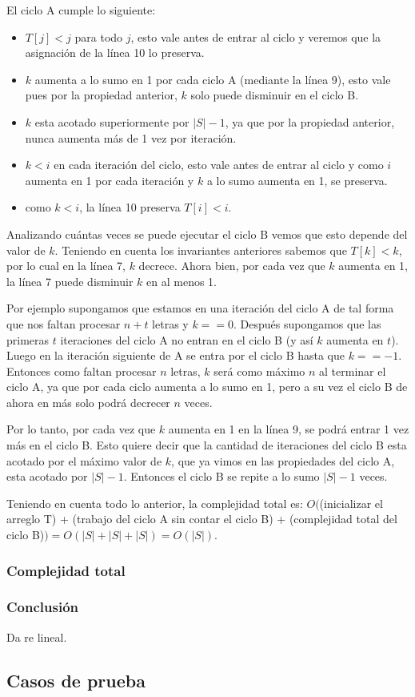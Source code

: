 El ciclo A cumple lo siguiente:
\begin{itemize}
	\item $T[j] < j$ para todo $j$, esto vale antes de entrar al ciclo
	y veremos que la asignación de la línea 10 lo preserva.
	\item $k$ aumenta a lo sumo en 1 por cada ciclo A (mediante la línea 9), esto vale pues por la
	propiedad anterior, $k$ solo puede disminuir en el ciclo B.
	\item $k$ esta acotado superiormente por $|S|-1$, ya que por la propiedad anterior, nunca
	aumenta más de 1 vez por iteración.
	\item $k < i$ en cada iteración del ciclo, esto vale antes de entrar al ciclo
	y como $i$ aumenta en 1 por cada iteración y $k$ a lo sumo aumenta en 1, se preserva.
	\item como $k < i$, la línea 10 preserva $T[i] < i$.
\end{itemize}

Analizando cuántas veces se puede ejecutar el ciclo B vemos que esto depende del valor de $k$.
Teniendo en cuenta los invariantes anteriores sabemos que $T[k] < k$, por lo cual en la línea 7,
$k$ decrece. Ahora bien, por cada vez que $k$ aumenta en 1, la línea 7 puede disminuir $k$ en al menos 1.

Por ejemplo supongamos que estamos en una iteración del ciclo A de tal forma que nos faltan procesar $n+t$
letras y $k == 0$. Después supongamos que las primeras $t$ iteraciones del ciclo A no entran en el ciclo B
(y así $k$ aumenta en $t$). Luego en la iteración siguiente de A se entra por el ciclo B hasta que
$k == -1$. Entonces como faltan procesar $n$ letras, $k$ será como máximo $n$ al terminar el ciclo A, 
ya que por cada ciclo aumenta a lo sumo en 1, pero a su vez el ciclo B de ahora en más solo podrá
decrecer $n$ veces.

Por lo tanto, por cada vez que $k$ aumenta en 1 en la línea 9, se podrá entrar 1 vez más en el ciclo B. Esto
quiere decir que la cantidad de iteraciones del ciclo B esta acotado por el máximo valor de $k$, que ya
vimos en las propiedades del ciclo A, esta acotado por $|S|-1$. Entonces el ciclo B se repite a lo sumo $|S|-1$
veces.

Teniendo en cuenta todo lo anterior, la complejidad total es:
$O($(inicializar el arreglo T) + (trabajo del ciclo A sin contar el ciclo B) + (complejidad total del ciclo B)$)
= O(|S| + |S| + |S|) = O(|S|)$.

\subsubsection{Complejidad total}

\subsubsection{Conclusión}

Da re lineal.

\subsection{Casos de prueba}